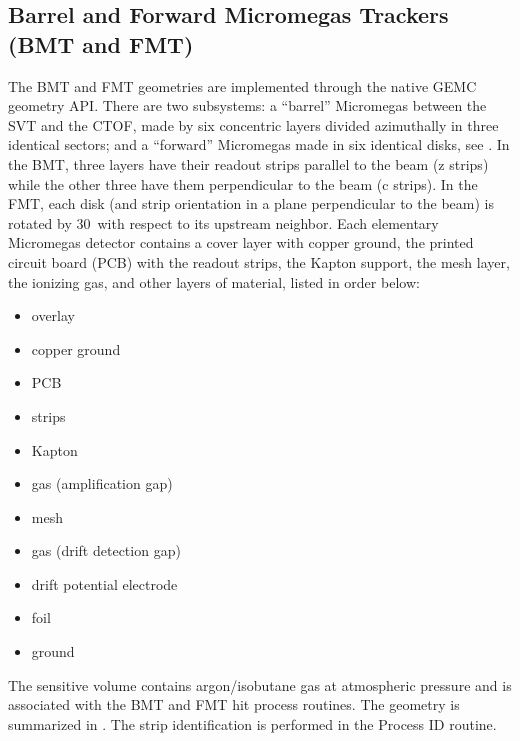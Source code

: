\subsection{Barrel and Forward Micromegas Trackers (BMT and FMT)}

The BMT and FMT geometries are implemented through the native GEMC geometry API.
There are two subsystems: a ``barrel'' Micromegas between the SVT and the CTOF, made by six concentric layers
divided azimuthally in three identical sectors; and a ``forward'' Micromegas
made in six identical disks, see . In the BMT, three layers have their readout strips parallel
to the beam (z strips) while the other three have them perpendicular to the
beam (c strips). In the FMT, each disk (and strip orientation in a plane perpendicular to the beam)
is rotated by 30\mdeg\ with respect to its upstream neighbor. Each elementary Micromegas detector contains a
cover layer with copper ground, the printed circuit board (PCB) with the readout strips,
the Kapton support, the mesh layer, the ionizing gas, and other layers of material, listed in order below:

\begin{itemize}
	\item overlay
	\item copper ground
	\item PCB
	\item strips
	\item Kapton
	\item gas (amplification gap)
	\item mesh
	\item gas (drift detection gap)
	\item drift potential electrode
	\item foil
	\item ground
\end{itemize}

The sensitive volume contains argon/isobutane gas at atmospheric pressure and is associated with the BMT and
FMT hit process routines.
The geometry is summarized in . The strip identification is performed in the Process ID routine.

